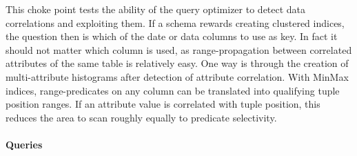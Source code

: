
This choke point tests the ability of the query optimizer to detect data correlations and exploiting them. If a schema rewards creating clustered indices, the question then is which of the date or data columns to use as key.
In fact it should not matter which column is used, as range-propagation between correlated attributes of the same table is relatively easy. One way is through the creation of multi-attribute histograms after detection of attribute correlation.
With MinMax indices, range-predicates on any column can be translated into qualifying tuple position ranges. If an attribute value is correlated with tuple position, this reduces the area to scan roughly equally to predicate selectivity.


\paragraph{Queries}
{\raggedright

}